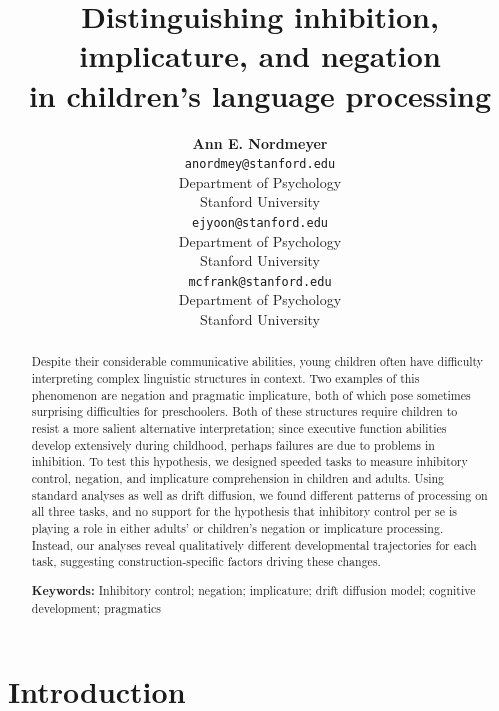 \documentclass[10pt,letterpaper]{article}
\title{Distinguishing inhibition, implicature, and negation \\
in children's language processing}
\author{{\large \bf Ann E. Nordmeyer} \\
 \texttt{anordmey@stanford.edu} \\
 Department of Psychology \\
 Stanford University
 \And {\large \bf Erica J. Yoon} \\
 \texttt{ejyoon@stanford.edu} \\
 Department of Psychology \\
 Stanford University
 \And {\large \bf Michael C. Frank} \\
 \texttt{mcfrank@stanford.edu} \\
 Department of Psychology \\
 Stanford University}
\newcommand{\ejy}[1]{\textcolor{Blue}{[ejy: #1]}}
\newcommand{\aen}[1]{\textcolor{DarkOrange}{[aen: #1]}}
\begin{document}
\maketitle


\begin{abstract}

Despite their considerable communicative abilities, young children often have difficulty interpreting complex linguistic structures in context. Two examples of this phenomenon are negation and pragmatic implicature, both of which pose sometimes surprising difficulties for preschoolers. Both of these structures require children to resist a more salient alternative interpretation; since executive function abilities develop extensively during childhood, perhaps failures are due to problems in inhibition. To test this hypothesis, we designed speeded tasks to measure inhibitory control, negation, and implicature comprehension in children and adults. Using standard analyses as well as drift diffusion, we found different patterns of processing on all three tasks, and no support for the hypothesis that inhibitory control per se is playing a role in either adults' or children's negation or implicature processing. Instead, our analyses reveal qualitatively different developmental trajectories for each task, suggesting construction-specific factors driving these changes.

\textbf{Keywords:}
Inhibitory control; negation; implicature; drift diffusion model; cognitive development; pragmatics
\end{abstract}


\section{Introduction}

%
%
\end{document}
